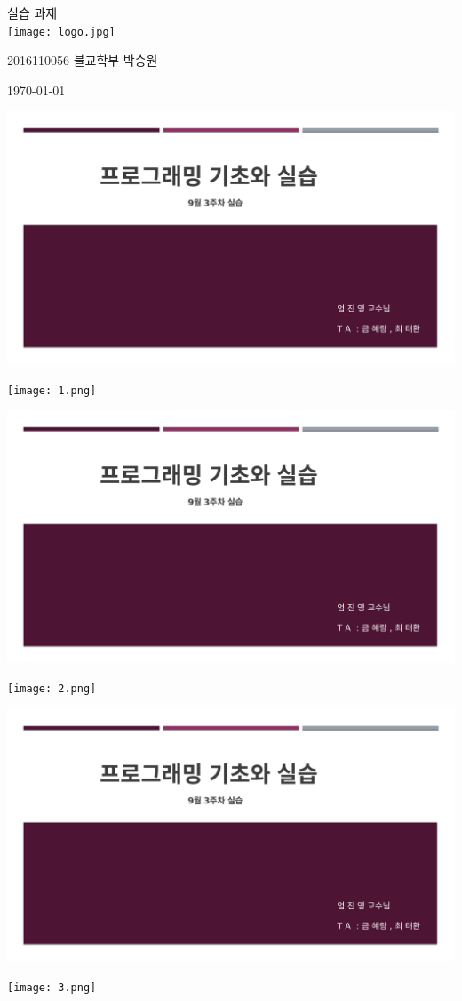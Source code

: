 \documentclass[11pt,a4paper]{article}
\begin{document}
\begin{center}
	 실습 과제\\
	\vspace{2cm}
\hfill\texttt{[image: logo.jpg]}

\hfill\Large 2016110056 불교학부 박승원

\hfill\today
\end{center}

\noindent
\lstset{language=C++, columns=flexible, tabsize=4, frame=shadowbox, showstringspaces=false, breaklines=true, upquote=true, basicstyle=\ttfamily\large}
\begin{enumerate}
\includegraphics[page=2, width=\textwidth]{1.pdf}
	
\texttt{[image: 1.png]}	

\includegraphics[page=3, width=\textwidth]{1.pdf}
	
\texttt{[image: 2.png]}	


\includegraphics[page=4, width=\textwidth]{1.pdf}
	
\texttt{[image: 3.png]}	


\end{enumerate}
\end{document}
